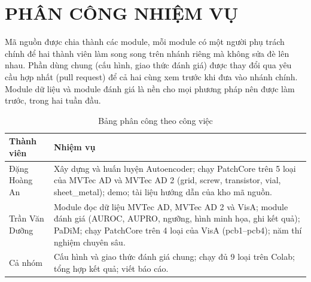 \chapter*{PHÂN CÔNG NHIỆM VỤ}

Mã nguồn được chia thành các module, mỗi module có một người phụ trách chính để hai thành viên làm song song trên
nhánh riêng mà không sửa đè lên nhau. Phần dùng chung (cấu hình, giao thức đánh giá) được thay đổi qua
yêu cầu hợp nhất (pull request) để cả hai cùng xem trước khi đưa vào nhánh chính. Module dữ liệu và module đánh giá
là nền cho mọi phương pháp nên được làm trước, trong hai tuần đầu.

\begin{table}[htbp]
  \centering
  \caption*{Bảng phân công theo công việc}
  \small
  \begin{tabular}{@{}>{\raggedright\arraybackslash}p{3.2cm} >{\raggedright\arraybackslash}p{11.3cm}@{}}
    \toprule
    Thành viên & Nhiệm vụ \\
    \midrule
    Đặng Hoàng An &
      Xây dựng và huấn luyện Autoencoder; chạy PatchCore trên 5 loại của MVTec AD và MVTec AD 2 (grid, screw,
      transistor, vial, sheet\_metal); demo; tài liệu hướng dẫn của kho mã nguồn. \\
    \addlinespace
    Trần Văn Dưỡng &
      Module đọc dữ liệu MVTec AD, MVTec AD 2 và VisA; module đánh giá (AUROC, AUPRO, ngưỡng, hình minh họa, ghi kết
      quả); PaDiM; chạy PatchCore trên 4 loại của VisA (pcb1--pcb4); năm thí nghiệm chuyên sâu. \\
    \addlinespace
    Cả nhóm &
      Cấu hình và giao thức đánh giá chung; chạy đủ 9 loại trên Colab; tổng hợp kết quả; viết báo cáo. \\
    \bottomrule
  \end{tabular}
\end{table}

